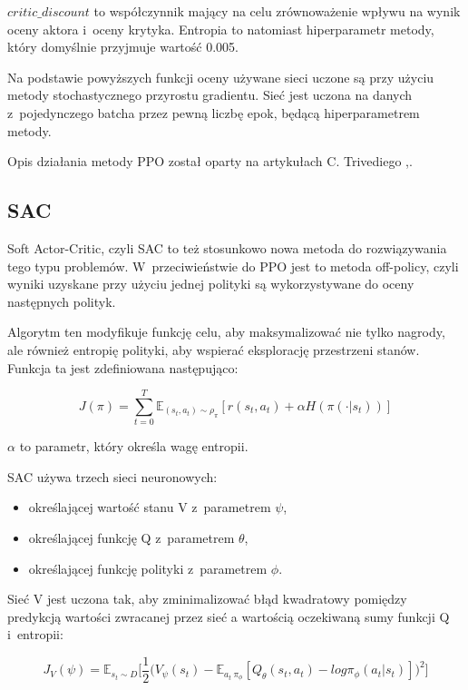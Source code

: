 \documentclass[a4paper,12pt]{article}
\begin{document}
$critic\_discount$ to współczynnik mający na celu zrównoważenie wpływu na wynik oceny aktora i~oceny krytyka. Entropia to natomiast hiperparametr metody, który domyślnie przyjmuje wartość 0.005. 

Na podstawie powyższych funkcji oceny używane sieci uczone są przy użyciu metody stochastycznego przyrostu gradientu. Sieć jest uczona na danych z~pojedynczego batcha przez pewną liczbę epok, będącą hiperparametrem metody.

Opis działania metody PPO został oparty na artykułach C. Trivediego \cite{ppo1},\cite{ppo2}.


\subsection{SAC}
Soft Actor-Critic, czyli SAC to też stosunkowo nowa metoda do rozwiązywania tego typu problemów. W~przeciwieństwie do PPO jest to metoda off-policy, czyli wyniki uzyskane przy użyciu jednej polityki są wykorzystywane do oceny następnych polityk.

Algorytm ten modyfikuje funkcję celu, aby maksymalizować nie tylko nagrody, ale również entropię polityki, aby wspierać eksplorację przestrzeni stanów. Funkcja ta jest zdefiniowana następująco:

\begin{equation}
	J(\pi) = \sum_{t=0}^T \mathbb{E}_{(s_t,a_t) \sim \rho_\pi} [r(s_t,a_t) + \alpha H(\pi(\cdot |s_t))]
\end{equation}

$\alpha$ to parametr, który określa wagę entropii.

SAC używa trzech sieci neuronowych:
\begin{itemize}
	\item określającej wartość stanu V z~parametrem $\psi$,
	\item określającej funkcję Q z~parametrem $\theta$,
	\item określającej funkcję polityki z~parametrem $\phi$.
\end{itemize}

Sieć V jest uczona tak, aby zminimalizować błąd  kwadratowy pomiędzy predykcją wartości zwracanej przez sieć a wartością oczekiwaną sumy funkcji Q i~entropii:

\begin{equation}
J_V(\psi) = \mathbb{E}_{s_t \sim D}\Big[ \frac{1}{2}\big(V_\psi(s_t) - \mathbb{E}_{a_t ~\pi_\phi} [Q_\theta(s_t,a_t) - log \pi_\phi (a_t|s_t)] \big)^2\Big]
\end{equation}
\end{document}
